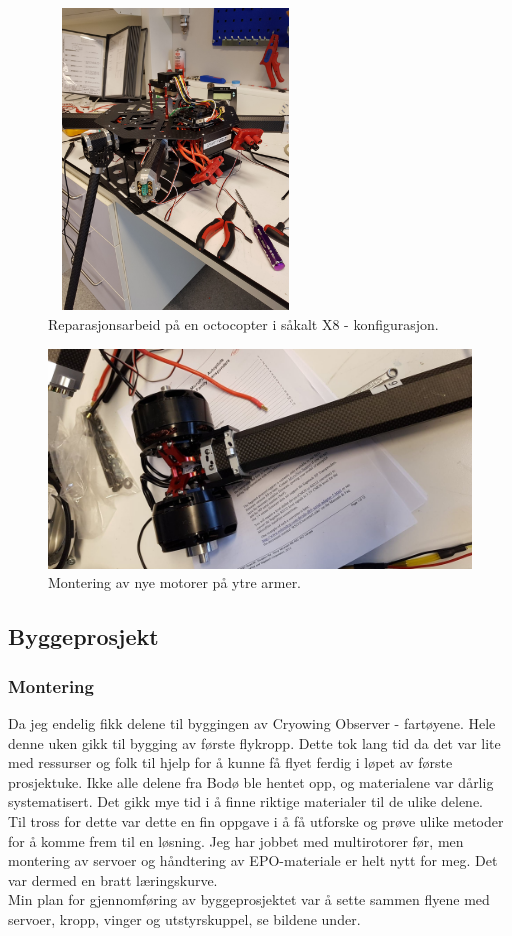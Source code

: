 \documentclass[12pt, a4paper]{report}
\begin{document}
\begin{figure}[ht]
	\centering
	\includegraphics[height = 8cm, width = 0.6\textwidth]{bilder/octocopt_x8.jpg}
	\caption{Reparasjonsarbeid på en octocopter i såkalt X8 - konfigurasjon.}
\end{figure}
\begin{figure}[ht]
	\centering
	\includegraphics[scale=.2]{bilder/octarm_x8.jpg}
	\caption{Montering av nye motorer på ytre armer.}
\end{figure}

\subsection{Byggeprosjekt}
\subsubsection{Montering}
Da jeg endelig fikk delene til byggingen av Cryowing Observer - fartøyene. Hele denne uken gikk til bygging av første flykropp. Dette tok lang tid da det var lite med ressurser og folk til hjelp for å kunne få flyet ferdig i løpet av første prosjektuke. Ikke alle delene fra Bodø ble hentet opp, og materialene var dårlig systematisert. Det gikk mye tid i å finne riktige materialer til de ulike delene.\\
Til tross for dette var dette en fin oppgave i å få utforske og prøve ulike metoder for å komme frem til en løsning. Jeg har jobbet med multirotorer før, men montering av servoer og håndtering av EPO-materiale er helt nytt for meg. Det var dermed en bratt læringskurve. \\ Min plan for gjennomføring av byggeprosjektet var å sette sammen flyene med servoer, kropp, vinger og utstyrskuppel, se bildene under.
\end{document}
